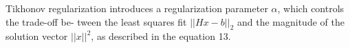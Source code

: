 \documentclass[unicode,11pt,a4paper,oneside,numbers=endperiod,openany]{scrartcl}
\newcommand{\norm}[1]{\lvert\lvert #1 \rvert\rvert}
\begin{document}
\begin{enumerate}[label=(\alph*)]
Tikhonov regularization introduces a regularization parameter ${\alpha}$, which controls the trade-off be-
tween the least squares fit ${\norm{Hx - b}_2}$ and the magnitude of the solution vector ${\norm{x}^2}$, as described in the equation 13.

\end{enumerate}
\end{document}

